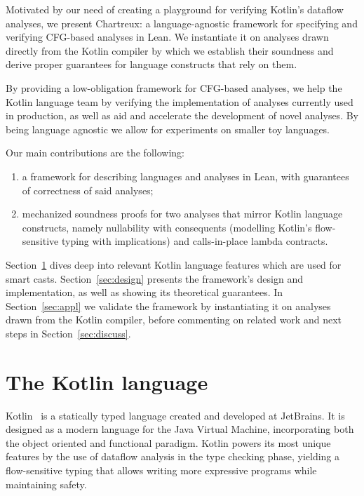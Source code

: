 \documentclass[runningheads]{llncs}
\newcommand{\Chartreux}{\textsf{Chartreux}}
\begin{document}
Motivated by our need of creating a playground for verifying Kotlin's dataflow analyses, we present \Chartreux: a language-agnostic framework for specifying and verifying CFG-based analyses in Lean. We instantiate it on analyses drawn directly from the Kotlin compiler by which we establish their soundness and derive proper guarantees for language constructs that rely on them.

By providing a low-obligation framework for CFG-based analyses, we help the Kotlin language team by verifying the implementation of analyses currently used in production, as well as aid and accelerate the development of novel analyses. By being language agnostic we allow for experiments on smaller toy languages.

Our main contributions are the following:
\begin{enumerate}
  \item a framework for describing languages and analyses in Lean, with guarantees of correctness of said analyses;
  \item mechanized soundness proofs for two analyses that mirror Kotlin language constructs, namely nullability with consequents (modelling Kotlin's flow-sensitive typing with implications) and calls-in-place lambda contracts.
\end{enumerate}

Section~\ref{sec:bg-kotlin} dives deep into relevant Kotlin language features which are used for smart casts. Section~\ref{sec:design} presents the framework's design and implementation, as well as showing its theoretical guarantees. In Section~\ref{sec:appl} we validate the framework by instantiating it on analyses drawn from the Kotlin compiler, before commenting on related work and next steps in Section~\ref{sec:discuss}.

\section{The Kotlin language}
\label{sec:bg-kotlin}

Kotlin~\cite{Kotlin} is a statically typed language created and developed at JetBrains. It is designed as a modern language for the Java Virtual Machine, incorporating both the object oriented and functional paradigm. Kotlin powers its most unique features by the use of dataflow analysis in the type checking phase, yielding a flow-sensitive typing that allows writing more expressive programs while maintaining safety.
\end{document}
